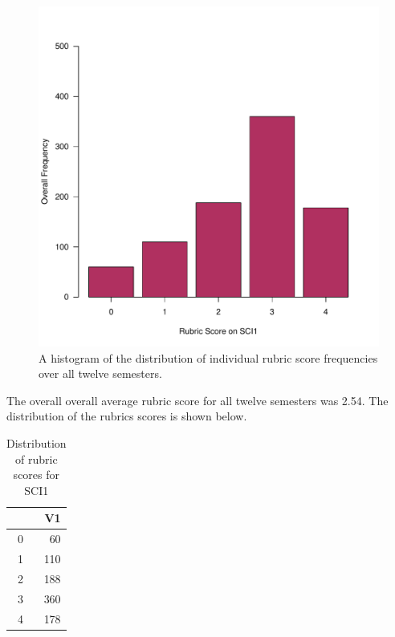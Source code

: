 \documentclass[fleqn,10pt]{SelfArx}\usepackage[]{graphicx}\usepackage[]{color}
\makeatletter
\def\maxwidth{ %
  \ifdim\Gin@nat@width>\linewidth
    \linewidth
  \else
    \Gin@nat@width
  \fi
}
\newenvironment{knitrout}{}{} %
\makeatother
\begin{document}
\begin{figure}[h]\centering
\begin{knitrout}
\color{fgcolor}
\includegraphics[width=\maxwidth]{figure/histogram-1} 

\end{knitrout}
\protect\caption{A histogram of the distribution of individual rubric score frequencies over all twelve semesters.}
\label{fig:histogram}
\end{figure}
The overall overall average rubric score for all twelve semesters was 2.54. The distribution of the rubrics scores is shown below.
\begin{center}
\begin{table}[ht]
\centering
\begin{tabular}{rr}
  \hline
 & V1 \\ 
  \hline
0 &  60 \\ 
  1 & 110 \\ 
  2 & 188 \\ 
  3 & 360 \\ 
  4 & 178 \\ 
   \hline
\end{tabular}
\caption{Distribution of rubric scores for SCI1} 
\label{tab:distribution}
\end{table}

\end{center}
\end{document}
